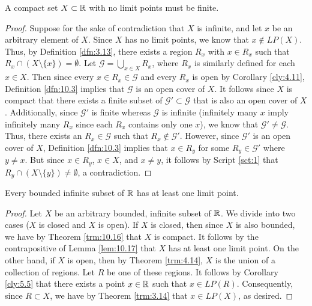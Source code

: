 \documentclass[../main.tex]{subfiles}
\begin{document}
\begin{lemma}\label{lem:10.17}
    A compact set $X\subset\mathbb{R}$ with no limit points must be finite.
    \begin{proof}
        Suppose for the sake of contradiction that $X$ is infinite, and let $x$ be an arbitrary element of $X$. Since $X$ has no limit points, we know that $x\notin LP(X)$. Thus, by Definition \ref{dfn:3.13}, there exists a region $R_x$ with $x\in R_x$ such that $R_x\cap(X\setminus\{x\})=\emptyset$. Let $\mathcal{G}=\bigcup_{x\in X}R_x$, where $R_x$ is similarly defined for each $x\in X$. Then since every $x\in R_x\in\mathcal{G}$ and every $R_x$ is open by Corollary \ref{cly:4.11}, Definition \ref{dfn:10.3} implies that $\mathcal{G}$ is an open cover of $X$. It follows since $X$ is compact that there exists a finite subset of $\mathcal{G}'\subset\mathcal{G}$ that is also an open cover of $X$. Additionally, since $\mathcal{G}'$ is finite whereas $\mathcal{G}$ is infinite (infinitely many $x$ imply infinitely many $R_x$ since each $R_x$ contains only one $x$), we know that $\mathcal{G}'\neq\mathcal{G}$. Thus, there exists an $R_x\in\mathcal{G}$ such that $R_x\notin\mathcal{G}'$. However, since $\mathcal{G}'$ is an open cover of $X$, Definition \ref{dfn:10.3} implies that $x\in R_y$ for some $R_y\in\mathcal{G}'$ where $y\neq x$. But since $x\in R_y$, $x\in X$, and $x\neq y$, it follows by Script \ref{sct:1} that $R_y\cap(X\setminus\{y\})\neq\emptyset$, a contradiction.
    \end{proof}
\end{lemma}

\begin{theorem}\label{trm:10.18}
    Every bounded infinite subset of $\mathbb{R}$ has at least one limit point.
    \begin{proof}
        Let $X$ be an arbitrary bounded, infinite subset of $\mathbb{R}$. We divide into two cases ($X$ is closed and $X$ is open). If $X$ is closed, then since $X$ is also bounded, we have by Theorem \ref{trm:10.16} that $X$ is compact. It follows by the contrapositive of Lemma \ref{lem:10.17} that $X$ has at least one limit point. On the other hand, if $X$ is open, then by Theorem \ref{trm:4.14}, $X$ is the union of a collection of regions. Let $R$ be one of these regions. It follows by Corollary \ref{cly:5.5} that there exists a point $x\in\mathbb{R}$ such that $x\in LP(R)$. Consequently, since $R\subset X$, we have by Theorem \ref{trm:3.14} that $x\in LP(X)$, as desired.
    \end{proof}
\end{theorem}
\end{document}
